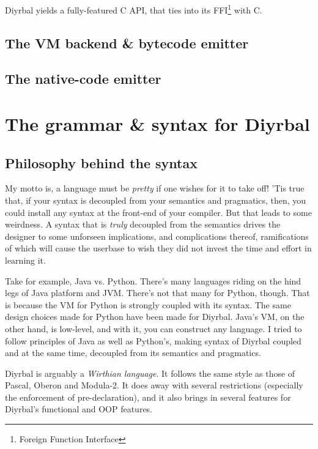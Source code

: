 \documentclass[a4paper,12pt]{article}
\newcommand{\nm}{Diyrbal\xspace}
\begin{document}
\nm yields a fully-featured C API, that ties into its FFI\footnote{Foreign Function Interface} with C.

\subsection{The VM backend \& bytecode emitter}


\subsection{The native-code emitter}




\section{The grammar \& syntax for \nm}

\subsection{Philosophy behind the syntax}

My motto is, a language must be \textit{pretty} if one wishes for it to take off! 'Tis true that, if your syntax is decoupled from your semantics and pragmatics, then, you could install any syntax at the front-end of your compiler. But that leads to some weirdness. A syntax that is \textit{truly} decoupled from the semantics drives the designer to some unforseen implications, and complications thereof, ramifications of which will cause the userbase to wish they did not invest the time and effort in learning it.

Take for example, Java vs. Python. There's many languages riding on the hind legs of Java platform and JVM. There's not that many for Python, though. That is because the VM for Python is strongly coupled with its syntax. The same design choices made for Python have been made for \nm. Java's VM, on the other hand, is low-level, and with it, you can construct any language. I tried to follow principles of Java as well as Python's, making syntax of \nm coupled and at the same time, decoupled from its semantics and pragmatics.

\nm is arguably a \textit{Wirthian language}. It follows the same style as those of Pascal, Oberon and Modula-2. It does away with several restrictions (especially the enforcement of pre-declaration), and it also brings in several features for \nm's functional and OOP features.
\end{document}
